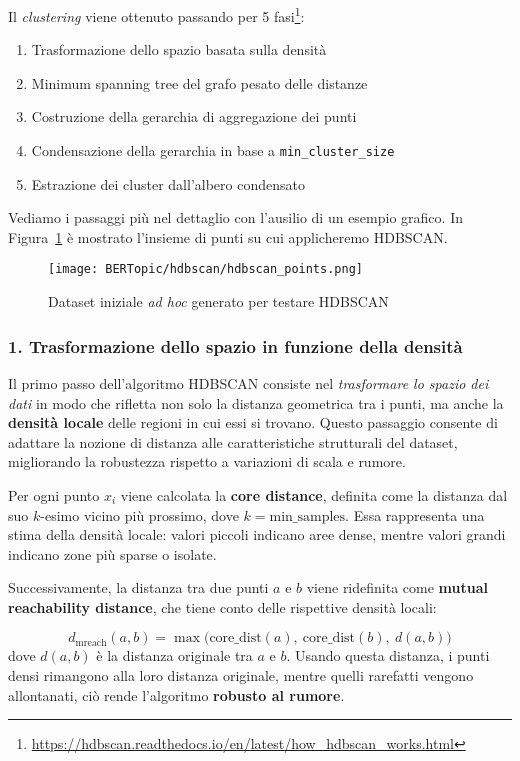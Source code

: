 \noindent Il \textit{clustering} viene ottenuto passando per 5 fasi\footnote{\url{https://hdbscan.readthedocs.io/en/latest/how_hdbscan_works.html}}:
\begin{enumerate}
    \item Trasformazione dello spazio basata sulla densità
    \item Minimum spanning tree del grafo pesato delle distanze
    \item Costruzione della gerarchia di aggregazione dei punti
    \item Condensazione della gerarchia in base a \texttt{min\_cluster\_size}
    \item Estrazione dei cluster dall'albero condensato
\end{enumerate}

Vediamo i passaggi più nel dettaglio con l'ausilio di un esempio grafico. In Figura~\ref{fig:hdbscan-points} è mostrato l'insieme di punti su cui applicheremo HDBSCAN.
\begin{figure}[H]
\centering
\texttt{[image: BERTopic/hdbscan/hdbscan\_points.png]}
\caption{Dataset iniziale \textit{ad hoc} generato per testare HDBSCAN}
\label{fig:hdbscan-points}
\end{figure}
\subsubsection*{1. Trasformazione dello spazio in funzione della densità}

Il primo passo dell'algoritmo HDBSCAN consiste nel \textit{trasformare lo spazio dei dati} in modo che rifletta non solo la distanza geometrica tra i punti, ma anche la \textbf{densità locale} delle regioni in cui essi si trovano. 
Questo passaggio consente di adattare la nozione di distanza alle caratteristiche strutturali del dataset, migliorando la robustezza rispetto a variazioni di scala e rumore.

Per ogni punto \( x_i \) viene calcolata la \textbf{core distance}, definita come la distanza dal suo \( k\)-esimo vicino più prossimo, dove \( k = \text{min\_samples} \). 
Essa rappresenta una stima della densità locale: valori piccoli indicano aree dense, mentre valori grandi indicano zone più sparse o isolate.

Successivamente, la distanza tra due punti \( a \) e \( b \) viene ridefinita come \textbf{mutual reachability distance}, che tiene conto delle rispettive densità locali:

\[
d_{\text{mreach}}(a,b) = \max \big( \text{core\_dist}(a),\ \text{core\_dist}(b),\ d(a,b) \big)
\]
dove $d(a,b)$ è la distanza originale tra $a$ e $b$. Usando questa distanza, i punti densi rimangono alla loro distanza originale, mentre quelli rarefatti vengono allontanati, ciò rende l'algoritmo \textbf{robusto al rumore}.
